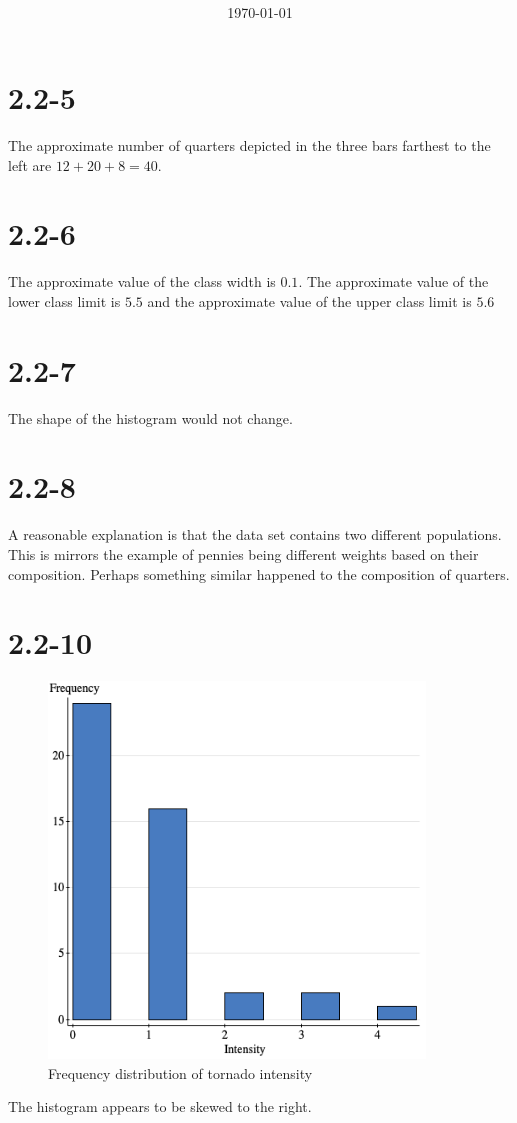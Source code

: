 \documentclass[12pt]{article}
\title{\classdescription\ \\ \classname\ \\ $\ $ \\ \assignment}
\author{\authorname}
\date{\today}
\newcommand{\chapter}{2.2}
\newcommand{\problem}[1]{\vspace{5ex}\section*{\chapter-#1}}
\begin{document}
\maketitle

\problem{5}
The approximate number of quarters depicted in the three bars farthest to the left are $12 + 20 + 8 = 40$.


\problem{6}
The approximate value of the class width is $0.1$. The approximate value of the lower class limit is $5.5$ and the approximate value of the upper class limit is $5.6$


\problem{7}
The shape of the histogram would not change.


\problem{8}
A reasonable explanation is that the data set contains two different populations. This is mirrors the example of pennies being different weights based on their composition. Perhaps something similar happened to the composition of quarters.


\problem{10}
\begin{figure}[ht]
  \centering
  \includegraphics[width=10cm]{assets/tornado-frequency.png}
  \caption{Frequency distribution of tornado intensity}
\end{figure}

The histogram appears to be skewed to the right.
\end{document}
